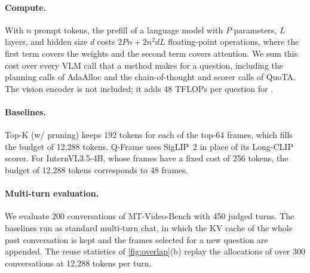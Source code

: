 \paragraph{Compute.} With $n$ prompt tokens, the prefill of a language model with $P$ parameters, $L$ layers, and
hidden size $d$ costs $2Pn+2n^2dL$ floating-point operations, where the first term covers the weights and the second
term covers attention. We sum this cost over every VLM call that a method makes for a question, including the
planning calls of AdaAlloc and the chain-of-thought and scorer calls of QuoTA. The vision encoder is not included; it
adds 48 TFLOPs per question for \name.

\paragraph{Baselines.} Top-K (w/ pruning) keeps 192 tokens for each of the top-64 frames, which fills the budget of
12,288 tokens. Q-Frame uses SigLIP~2 in place of its Long-CLIP scorer. For InternVL3.5-4B, whose frames have a
fixed cost of 256 tokens, the budget of 12,288 tokens corresponds to 48 frames.

\paragraph{Multi-turn evaluation.} We evaluate 200 conversations of MT-Video-Bench with 450 judged turns. The baselines
run as standard multi-turn chat, in which the KV cache of the whole past conversation is kept and the frames selected
for a new question are appended. The reuse statistics of \cref{fig:overlap}(b) replay the allocations of \name over
300 conversations at 12,288 tokens per turn.
